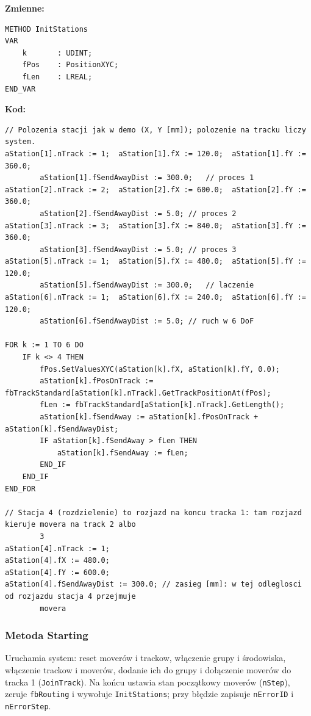\documentclass[11pt,a4paper]{report}
\newcommand{\podpodrozdzial}[1]{\subsubsection*{#1}\addcontentsline{toc}{subsubsection}{#1}}
\begin{document}
\textbf{Zmienne:}
{\scriptsize
\begin{verbatim}
METHOD InitStations
VAR
    k       : UDINT;
    fPos    : PositionXYC;
    fLen    : LREAL;
END_VAR
\end{verbatim}}
\textbf{Kod:}
{\scriptsize
\begin{verbatim}
// Polozenia stacji jak w demo (X, Y [mm]); polozenie na tracku liczy system.
aStation[1].nTrack := 1;  aStation[1].fX := 120.0;  aStation[1].fY := 360.0;
        aStation[1].fSendAwayDist := 300.0;   // proces 1
aStation[2].nTrack := 2;  aStation[2].fX := 600.0;  aStation[2].fY := 360.0;
        aStation[2].fSendAwayDist := 5.0; // proces 2
aStation[3].nTrack := 3;  aStation[3].fX := 840.0;  aStation[3].fY := 360.0;
        aStation[3].fSendAwayDist := 5.0; // proces 3
aStation[5].nTrack := 1;  aStation[5].fX := 480.0;  aStation[5].fY := 120.0;
        aStation[5].fSendAwayDist := 300.0;   // laczenie
aStation[6].nTrack := 1;  aStation[6].fX := 240.0;  aStation[6].fY := 120.0;
        aStation[6].fSendAwayDist := 5.0; // ruch w 6 DoF

FOR k := 1 TO 6 DO
    IF k <> 4 THEN
        fPos.SetValuesXYC(aStation[k].fX, aStation[k].fY, 0.0);
        aStation[k].fPosOnTrack := fbTrackStandard[aStation[k].nTrack].GetTrackPositionAt(fPos);
        fLen := fbTrackStandard[aStation[k].nTrack].GetLength();
        aStation[k].fSendAway := aStation[k].fPosOnTrack + aStation[k].fSendAwayDist;
        IF aStation[k].fSendAway > fLen THEN
            aStation[k].fSendAway := fLen;
        END_IF
    END_IF
END_FOR

// Stacja 4 (rozdzielenie) to rozjazd na koncu tracka 1: tam rozjazd kieruje movera na track 2 albo
        3
aStation[4].nTrack := 1;
aStation[4].fX := 480.0;
aStation[4].fY := 600.0;
aStation[4].fSendAwayDist := 300.0; // zasieg [mm]: w tej odleglosci od rozjazdu stacja 4 przejmuje
        movera
\end{verbatim}}

\podpodrozdzial{Metoda Starting}
Uruchamia system: reset moverów i trackow, włączenie grupy i środowiska, włączenie trackow i moverów, dodanie ich do grupy i dołączenie moverów do tracka 1 (\texttt{JoinTrack}). Na końcu ustawia stan początkowy moverów (\texttt{nStep}), zeruje \texttt{fbRouting} i wywołuje \texttt{InitStations}; przy błędzie zapisuje \texttt{nErrorID} i \texttt{nErrorStep}.
\end{document}
